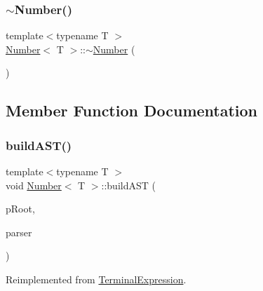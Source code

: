 \mbox{\label{class_number_a67c5fc51a64c6ec9438d35c60f17182c}} 
\subsubsection{\texorpdfstring{$\sim$Number()}{~Number()}}
{\footnotesize\ttfamily template$<$typename T $>$ \\
\mbox{\hyperlink{class_number}{Number}}$<$ T $>$\+::$\sim$\mbox{\hyperlink{class_number}{Number}} (\begin{DoxyParamCaption}{ }\end{DoxyParamCaption})}



\subsection{Member Function Documentation}
\mbox{\label{class_number_af80f6bc48cbe13fb075447a0b8eca5f9}} 
\subsubsection{\texorpdfstring{buildAST()}{buildAST()}}
{\footnotesize\ttfamily template$<$typename T $>$ \\
void \mbox{\hyperlink{class_number}{Number}}$<$ T $>$\+::build\+A\+ST (\begin{DoxyParamCaption}\item[{std\+::unique\+\_\+ptr$<$ \mbox{\hyperlink{class_abstract_expression}{Abstract\+Expression}} $>$ \&}]{p\+Root,  }\item[{\mbox{\hyperlink{class_parser}{Parser}} \&}]{parser }\end{DoxyParamCaption})\hspace{0.3cm}{\ttfamily [virtual]}}



Reimplemented from \mbox{\hyperlink{class_terminal_expression_a24eb92076324c9c57539b68015d42baa}{Terminal\+Expression}}.

\mbox{\label{class_number_a870d87540c5e4fc92b061eb11ba1853f}} 
